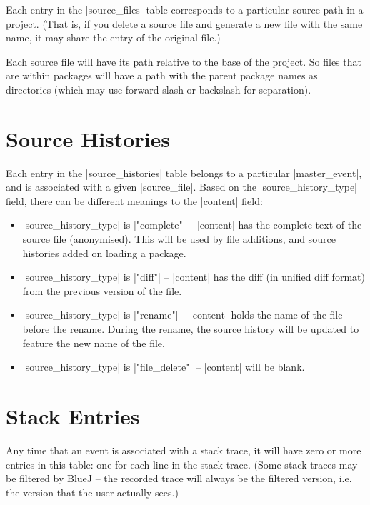 \documentclass{report}
\begin{document}

Each entry in the |source_files| table corresponds to a particular
source path in a project.  (That is, if you delete a source file and
generate a new file with the same name, it may share the entry of the
original file.)

Each source file will have its path relative to the base of the
project.  So files that are within packages will have a path with the
parent package names as directories (which may use forward slash or
backslash for separation).

\section{Source Histories}


Each entry in the |source_histories| table belongs to a particular
|master_event|, and is associated with a given |source_file|.  Based on the
|source_history_type| field, there can be different meanings to the |content| field:

\begin{itemize}
\item |source_history_type| is |"complete"| -- |content| has the complete text
  of the source file (anonymised).  This will be
  used by file additions, and source histories added on loading a package.
\item |source_history_type| is |"diff"| -- |content| has the diff (in unified diff format) from
  the previous version of the file.
\item |source_history_type| is |"rename"| -- |content| holds the name of the file before the rename.  During the
  rename, the source history will be updated to feature the new name of the
  file.
\item |source_history_type| is |"file_delete"| -- |content| will be blank.
\end{itemize}

\section{Stack Entries}


Any time that an event is associated with a stack trace, it will have
zero or more entries in this table: one for each line in the stack
trace.  (Some stack traces may be filtered by BlueJ -- the recorded
trace will always be the filtered version, i.e. the version that the
user actually sees.)
\end{document}
